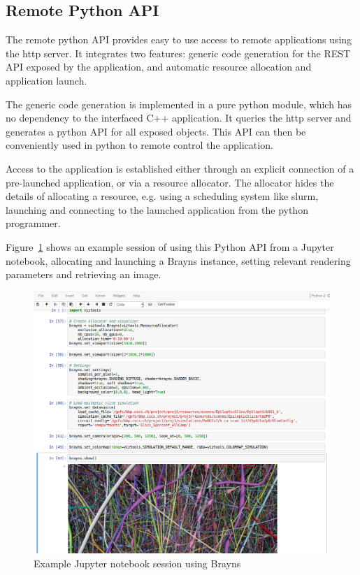\documentclass[10pt]{llncs}
\newcommand{\fig}[1]{Figure~\ref{#1}}
\begin{document}
\subsection{Remote Python API}

The remote python API provides easy to use access to remote applications using
the http server. It integrates two features: generic code generation for the
REST API exposed by the application, and automatic resource allocation and
application launch.

The generic code generation is implemented in a pure python module, which has
no dependency to the interfaced C++ application. It queries the http server and
generates a python API for all exposed objects. This API can then be
conveniently used in python to remote control the application.

Access to the application is established either through an explicit connection
of a pre-launched application, or via a resource allocator. The allocator hides
the details of allocating a resource, e.g. using a scheduling system like
slurm, launching and connecting to the launched application from the python
programmer.

\fig{fJupyter} shows an example session of using this Python API from a Jupyter
notebook, allocating and launching a Brayns instance, setting relevant
rendering parameters and retrieving an image.

\begin{figure}[ht]\center
  \includegraphics[width=\columnwidth]{images/jupyter}
  \caption{\label{fJupyter}Example Jupyter notebook session using Brayns}
\end{figure}
\end{document}
